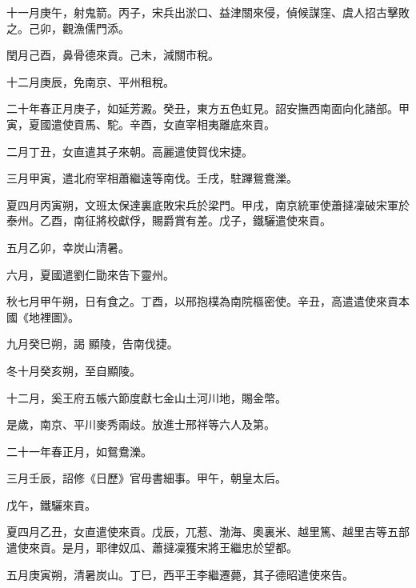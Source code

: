 \begin{pinyinscope}
 十一月庚午，射鬼箭。丙子，宋兵出淤口、益津關來侵，偵候謀窪、虞人招古擊敗之。己卯，觀漁儒門添。



 閏月己酉，鼻骨德來貢。己未，減關市稅。



 十二月庚辰，免南京、平州租稅。



 二十年春正月庚子，如延芳澱。癸丑，東方五色虹見。詔安撫西南面向化諸部。甲寅，夏國遣使貢馬、駝。辛酉，女直宰相夷離底來貢。



 二月丁丑，女直遣其子來朝。高麗遣使賀伐宋捷。



 三月甲寅，遣北府宰相蕭繼遠等南伐。壬戌，駐蹕鴛鴦濼。



 夏四月丙寅朔，文班太保達裏底敗宋兵於梁門。甲戌，南京統軍使蕭撻凜破宋軍於泰州。乙酉，南征將校獻俘，賜爵賞有差。戊子，鐵驪遣使來貢。



 五月乙卯，幸炭山清暑。



 六月，夏國遣劉仁勖來告下靈州。



 秋七月甲午朔，日有食之。丁酉，以邢抱樸為南院樞密使。辛丑，高遣遣使來貢本國《地裡圖》。



 九月癸巳朔，謁
 顯陵，告南伐捷。



 冬十月癸亥朔，至自顯陵。



 十二月，奚王府五帳六節度獻七金山土河川地，賜金幣。



 是歲，南京、平川麥秀兩歧。放進士邢祥等六人及第。



 二十一年春正月，如鴛鴦濼。



 三月壬辰，詔修《日歷》官毋書細事。甲午，朝皇太后。



 戊午，鐵驪來貢。



 夏四月乙丑，女直遣使來貢。戊辰，兀惹、渤海、奧裏米、越里篤、越里吉等五部遣使來貢。是月，耶律奴瓜、蕭撻凜獲宋將王繼忠於望都。



 五月庚寅朔，清暑炭山。丁巳，西平王李繼遷薨，其子德昭遣使來告。




\end{pinyinscope}
